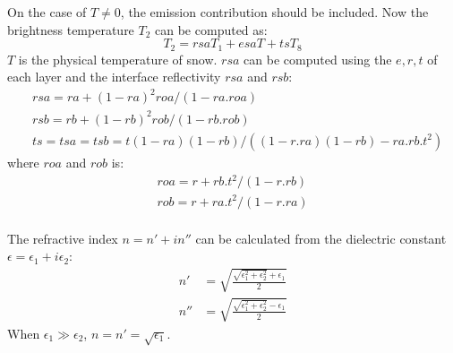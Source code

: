 On the case of $T\neq0$, the emission contribution should be included. Now the brightness temperature $T_2$ can be computed as: 
\begin{equation*}
  T_2 = rsaT_1+esaT+tsT_8
\end{equation*}
$T$ is the physical temperature of snow. $rsa$ can be computed using the $e,r,t$ of each layer and the interface reflectivity $rsa$ and $rsb$:
\begin{equation*}
  \begin{split}
    &rsa=ra+(1-ra)^2roa/(1-ra.roa)\\
    &rsb=rb+(1-rb)^2rob/(1-rb.rob)\\
&ts=tsa=tsb=t(1-ra)(1-rb)/((1-r.ra)(1-rb)-ra.rb.t^2)
  \end{split}
\end{equation*}
where $roa$ and $rob$ is:
\begin{equation*}
  \begin{split}
    roa=r+rb.t^2/(1-r.rb)\\
    rob=r+ra.t^2/(1-r.ra)\\
  \end{split}
\end{equation*}

The refractive index $n=n'+in''$ can be calculated from the dielectric constant $\epsilon = \epsilon_1+i\epsilon_2$:
\begin{equation*}
\begin{split}
  n'&=\sqrt{\frac{\sqrt{\epsilon_1^2+\epsilon_2^2}+\epsilon_1}{2}}\\
  n''&=\sqrt{\frac{\sqrt{\epsilon_1^2+\epsilon_2^2}-\epsilon_1}{2}}
\end{split}
\end{equation*}
When $\epsilon_1\gg\epsilon_2$, $n=n'=\sqrt{\epsilon_1}$.\\

